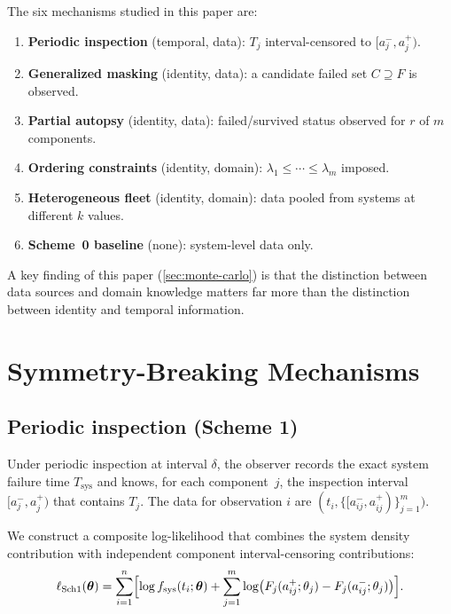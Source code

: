 \documentclass[12pt]{article}
\newcommand{\Tsys}{T_{\mathrm{sys}}}
\newcommand{\fsys}{f_{\mathrm{sys}}}
\newcommand{\btheta}{\boldsymbol{\theta}}
\begin{document}
The six mechanisms studied in this paper are:
\begin{enumerate}
  \item \textbf{Periodic inspection} (temporal, data): $T_j$ interval-censored
    to $[a_j^{-}, a_j^{+})$.
  \item \textbf{Generalized masking} (identity, data): a candidate failed
    set $C \supseteq F$ is observed.
  \item \textbf{Partial autopsy} (identity, data): failed/survived status
    observed for $r$ of $m$ components.
  \item \textbf{Ordering constraints} (identity, domain): $\lambda_1 \leq
    \cdots \leq \lambda_m$ imposed.
  \item \textbf{Heterogeneous fleet} (identity, domain): data pooled from
    systems at different $k$ values.
  \item \textbf{Scheme~0 baseline} (none): system-level data only.
\end{enumerate}

A key finding of this paper (\cref{sec:monte-carlo}) is that the distinction
between data sources and domain knowledge matters far more than the distinction
between identity and temporal information.


\section{Symmetry-Breaking Mechanisms}\label{sec:mechanisms}

\subsection{Periodic inspection (Scheme 1)}\label{sec:periodic}

Under periodic inspection at interval $\delta$, the observer records the
exact system failure time $\Tsys$ and knows, for each component~$j$, the
inspection interval $[a_j^{-}, a_j^{+})$ that contains $T_j$.
The data for observation $i$ are
$(t_i, \{[a_{ij}^{-}, a_{ij}^{+})\}_{j=1}^{m})$.

We construct a composite log-likelihood that combines the system density
contribution with independent component interval-censoring contributions:
\begin{equation}\label{eq:scheme1-ll}
  \ell_{\text{Sch1}}(\btheta) = \sum_{i=1}^{n}
    \Bigl[\log \fsys(t_i; \btheta)
    + \sum_{j=1}^{m} \log\bigl(F_j(a_{ij}^{+}; \theta_j) -
      F_j(a_{ij}^{-}; \theta_j)\bigr)\Bigr].
\end{equation}
\end{document}
